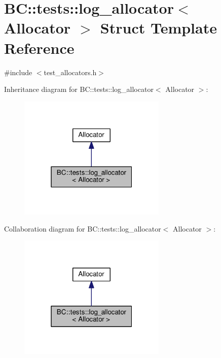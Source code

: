 \hypertarget{structBC_1_1tests_1_1log__allocator}{}\section{BC\+:\+:tests\+:\+:log\+\_\+allocator$<$ Allocator $>$ Struct Template Reference}
\label{structBC_1_1tests_1_1log__allocator}


{\ttfamily \#include $<$test\+\_\+allocators.\+h$>$}



Inheritance diagram for BC\+:\+:tests\+:\+:log\+\_\+allocator$<$ Allocator $>$\+:
\nopagebreak
\begin{figure}[H]
\begin{center}
\leavevmode
\includegraphics[width=199pt]{structBC_1_1tests_1_1log__allocator__inherit__graph}
\end{center}
\end{figure}


Collaboration diagram for BC\+:\+:tests\+:\+:log\+\_\+allocator$<$ Allocator $>$\+:
\nopagebreak
\begin{figure}[H]
\begin{center}
\leavevmode
\includegraphics[width=199pt]{structBC_1_1tests_1_1log__allocator__coll__graph}
\end{center}
\end{figure}

